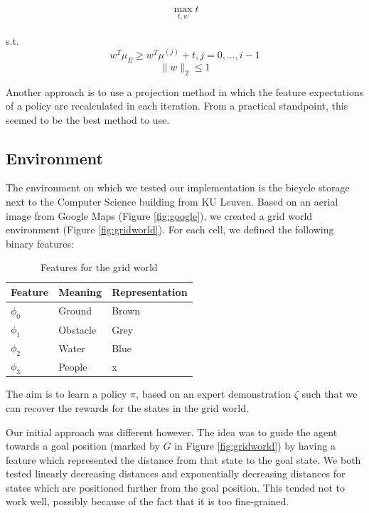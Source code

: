 \documentclass[10pt,a4paper,twocolumn]{article}
\begin{document}
$$\max\limits_{t, w} t$$\\
s.t. $$w^T \mu_E \geq w^T \mu^{(j)} + t, j= 0,...,i-1$$
$$\|w\|_2 \leq 1$$

Another approach is to use a projection method in which the feature expectations of a policy are recalculated in each iteration. From a practical standpoint, this seemed to be the best method to use.

\subsection{Environment}
The environment on which we tested our implementation is the bicycle storage next to the Computer Science building from KU Leuven. Based on an aerial image from Google Maps (Figure \ref{fig:google}), we created a grid world environment (Figure \ref{fig:gridworld}). For each cell, we defined the following binary features:

\begin{table}[h]
\centering
\begin{tabular}{|l|l|l|}
	\hline
	Feature		&	Meaning		&	Representation\\\hline
	$\phi_0$		&	Ground		&	Brown\\
	$\phi_1$		&	Obstacle		&	Grey\\
	$\phi_2$		&	Water		&	Blue\\
	$\phi_3$		&	People		&	x\\
	\hline
\end{tabular}
\caption{Features for the grid world}
\end{table}

The aim is to learn a policy $\pi$, based on an expert demonstration $\zeta$ such that we can recover the rewards for the states in the grid world.

Our initial approach was different however. The idea was to guide the agent towards a goal position (marked by $G$ in Figure \ref{fig:gridworld}) by having a feature which represented the distance from that state to the goal state.
We both tested linearly decreasing distances and exponentially decreasing distances for states which are positioned further from the goal position. This tended not to work well, possibly because of the fact that it is too fine-grained.
\end{document}
